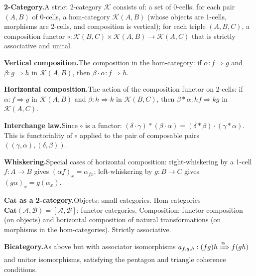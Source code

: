 \begin{formalrestatement}

\textbf{2-Category.}\quad A strict 2-category $\mathcal{K}$ consists of:
a set of 0-cells; for each pair $(A,B)$ of 0-cells, a hom-category
$\mathcal{K}(A,B)$ (whose objects are 1-cells, morphisms are 2-cells, and
composition is vertical); for each triple $(A,B,C)$, a composition functor
$\circ: \mathcal{K}(B,C) \times \mathcal{K}(A,B) \to \mathcal{K}(A,C)$
that is strictly associative and unital.

\textbf{Vertical composition.}\quad The composition in the hom-category:
if $\alpha: f \Rightarrow g$ and $\beta: g \Rightarrow h$ in
$\mathcal{K}(A,B)$, then $\beta \cdot \alpha : f \Rightarrow h$.

\textbf{Horizontal composition.}\quad The action of the composition
functor on 2-cells: if $\alpha: f \Rightarrow g$ in $\mathcal{K}(A,B)$
and $\beta: h \Rightarrow k$ in $\mathcal{K}(B,C)$, then
$\beta * \alpha: hf \Rightarrow kg$ in $\mathcal{K}(A,C)$.

\textbf{Interchange law.}\quad Since $\circ$ is a functor:
$(\delta \cdot \gamma) * (\beta \cdot \alpha) = (\delta * \beta) \cdot
(\gamma * \alpha)$. This is functoriality of $\circ$ applied to the pair
of composable pairs $((\gamma, \alpha), (\delta, \beta))$.

\textbf{Whiskering.}\quad Special cases of horizontal composition:
right-whiskering by a 1-cell $f: A \to B$ gives $(\alpha f)_x =
\alpha_{fx}$; left-whiskering by $g: B \to C$ gives $(g\alpha)_x =
g(\alpha_x)$.

\textbf{$\mathbf{Cat}$ as a 2-category.}\quad Objects: small categories.
Hom-categories $\mathbf{Cat}(\mathcal{A}, \mathcal{B}) = [\mathcal{A},
\mathcal{B}]$: functor categories. Composition: functor composition (on
objects) and horizontal composition of natural transformations (on
morphisms in the hom-categories). Strictly associative.

\textbf{Bicategory.}\quad As above but with associator isomorphisms
$a_{f,g,h}: (fg)h \xRightarrow{\cong} f(gh)$ and unitor isomorphisms,
satisfying the pentagon and triangle coherence conditions.

\end{formalrestatement}
